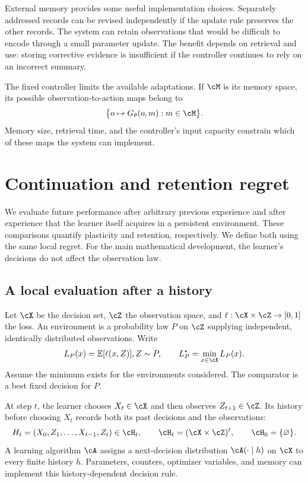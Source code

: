 \documentclass[11pt,twoside]{article}
\newcommand{\E}{\mathbb E}
\theoremstyle{definition}
\theoremstyle{remark}
\begin{document}
External memory provides some useful implementation choices. Separately
addressed records can be revised independently if the update rule preserves
the other records. The system can retain observations that would be difficult
to encode through a small parameter update. The benefit depends on retrieval
and use: storing corrective evidence is insufficient if the controller
continues to rely on an incorrect summary.

The fixed controller limits the available adaptations. If $\cM$ is its
memory space, its possible observation-to-action maps belong to
\[
 \bigl\{o\mapsto G_\theta(o,m):m\in\cM\bigr\}.
\]
Memory size, retrieval time, and the controller's input capacity constrain
which of these maps the system can implement.

\section{Continuation and retention regret}
\label{sec:framework}

We evaluate future performance after arbitrary previous experience and
after experience that the learner itself acquires in a persistent
environment. These comparisons quantify plasticity and retention,
respectively. We define both using the same local regret. For the main
mathematical development, the learner's decisions do not affect the
observation law.

\subsection{A local evaluation after a history}

Let $\cX$ be the decision set, $\cZ$ the observation space, and
$\ell:\cX\times\cZ\to[0,1]$ the loss. An environment is a probability law
$P$ on $\cZ$ supplying independent, identically distributed observations.
Write
\begin{equation}
 L_P(x)=\E[\ell(x,Z)],\quad Z\sim P,\qquad
 L_P^\star=\min_{x\in\cX}L_P(x).
 \label{eq:population}
\end{equation}
Assume the minimum exists for the environments considered. The comparator
is a best fixed decision for $P$.

At step $t$, the learner chooses $X_t\in\cX$ and then observes
$Z_{t+1}\in\cZ$. Its history before choosing $X_t$ records both its
past decisions and the observations:
\[
 H_t=(X_0,Z_1,\ldots,X_{t-1},Z_t)\in\cH_t,
 \qquad \cH_t=(\cX\times\cZ)^t,\qquad \cH_0=\{\varnothing\}.
\]
A learning algorithm $\cA$ assigns a next-decision distribution
$\cA(\cdot\mid h)$ on $\cX$ to every finite history $h$.
Parameters, counters, optimizer variables, and memory can implement this
history-dependent decision rule.
\end{document}
